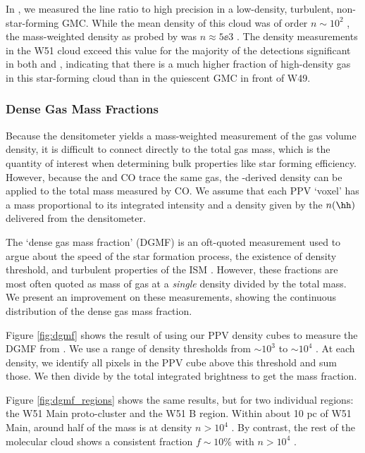 In \citet{Ginsburg2013b}, we measured the \formaldehyde line ratio to high
precision in a low-density, turbulent, non-star-forming GMC.  While the mean
density of this cloud was of order $n\sim10^2$ \percc, the mass-weighted
density as probed by \formaldehyde was $n\approx5\ee{3}$ \percc.  The density
measurements in the W51 cloud exceed this value for the majority of the
detections significant in both \oneone and \twotwo, indicating that there is a
much higher fraction of high-density gas in this star-forming cloud than in the
quiescent GMC in front of W49.

\subsubsection{Dense Gas Mass Fractions}
Because the \formaldehyde densitometer yields a mass-weighted measurement of
the gas volume density, it is difficult to connect directly to the total gas
mass, which is the quantity of interest when determining bulk properties like
star forming efficiency.  However, because the \formaldehyde and CO trace the
same gas, the \formaldehyde-derived density can be applied to the total mass
measured by CO.  We assume that each \thirteenco PPV `voxel' has a mass
proportional to its integrated intensity and a density given by the $n(\hh)$
delivered from the \formaldehyde densitometer.

The `dense gas mass fraction' (DGMF) is an oft-quoted measurement used to argue
about the speed of the star formation process, the existence of density
threshold, and turbulent properties of the ISM \citep[e.g. Fig. 5
of][]{Krumholz2007a,Battisti2014a,Kainulainen2013a,Juneau2009a,Muraoka2009a,Hopkins2013e}.
However, these fractions are most often quoted as mass of gas at a \emph{single}
density divided by the total mass.  We present an improvement on these measurements,
showing the continuous distribution of the dense gas mass fraction.

Figure \ref{fig:dgmf} shows the result of using our \formaldehyde PPV density
cubes to measure the DGMF from \thirteenco.  We use a range of density
thresholds from $\sim10^3$ to $\sim10^4$ \percc.  At each density, we identify
all pixels in the \thirteenco PPV cube above this threshold and sum those.  We
then divide by the total integrated \thirteenco brightness to get the mass
fraction. 

Figure \ref{fig:dgmf_regions} shows the same results, but for two individual
regions: the W51 Main proto-cluster and the W51 B region.  Within about 10 pc
of W51 Main, around half of the mass is at density $n>10^4$ \percc.  By
contrast, the rest of the molecular cloud shows a consistent fraction
$f\sim10\%$ with $n>10^4$ \percc.


